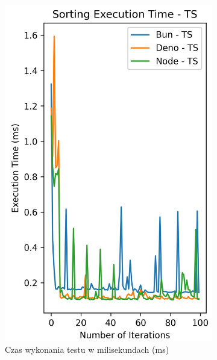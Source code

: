\begin{figure}[H]
  \centering
  \begin{subfigure}[b]{0.4\textwidth}
    \centering
    \includegraphics[width=\textwidth]{Figures/sorting/sorting_radix_100_1000_ts_time.png}
    \caption{Czas wykonania testu w milisekundach (ms)}
    \label{fig:radix_sorting_e1_ts_time}
  \end{subfigure}
  \begin{subfigure}[b]{0.4\textwidth}
    \centering

\end{subfigure}
\end{figure}

